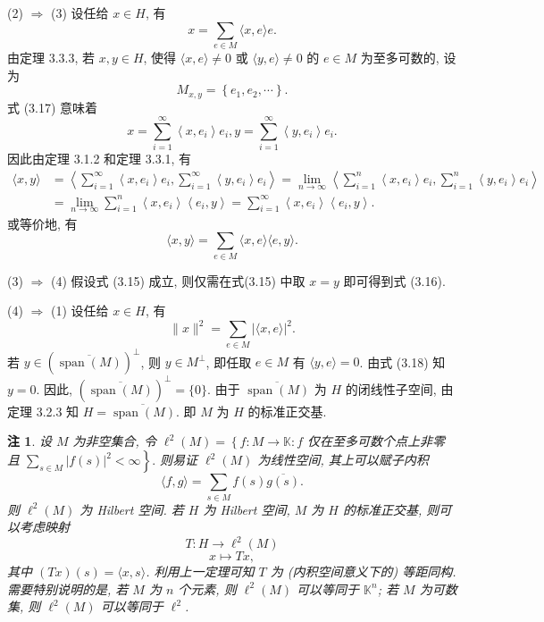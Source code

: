 \documentclass[openany]{ctexbook}
\makeatletter
\theoremstyle{kaiti}
\theoremstyle{normal}
\newtheorem{remark}{注}[section]
\renewenvironment{proof}[1][\proofname]{\par
    \pushQED{\qed}%
    \normalfont \topsep6\p@\@plus6\p@\relax
    \trivlist
    \item\relax
    {\heiti #1}\hspace{2\labelsep}\ignorespaces
  }{%
    \popQED\endtrivlist\@endpefalse
  }
\makeatother
\begin{document}
\begin{proof}
(2) $\Rightarrow$ (3) 设任给 $x \in H$, 有
\begin{equation}
  x=\sum_{e \in M}\langle x, e\rangle e.
\end{equation}
由定理 3.3.3, 若 $x, y \in H$, 使得 $\langle x, e\rangle \neq 0$ 或 $\langle y, e\rangle \neq 0$ 的 $e \in M$ 为至多可数的, 设为
$$
M_{x, y}=\left\{e_1, e_2, \cdots\right\}.
$$
式 (3.17) 意味着
$$
x=\sum_{i=1}^{\infty}\left\langle x, e_{i}\right\rangle e_{i}, y=\sum_{i=1}^{\infty}\left\langle y, e_{i}\right\rangle e_{i}.
$$
因此由定理 3.1.2 和定理 3.3.1, 有
$$
\begin{aligned}
\langle x, y\rangle &=\left\langle\sum_{i=1}^{\infty}\left\langle x, e_{i}\right\rangle e_{i}, \sum_{i=1}^{\infty}\left\langle y, e_{i}\right\rangle e_{i}\right\rangle=\lim_{n \rightarrow \infty}\left\langle\sum_{i=1}^n\left\langle x, e_{i}\right\rangle e_{i}, \sum_{i=1}^n\left\langle y, e_{i}\right\rangle e_{i}\right\rangle \\
&=\lim_{n \rightarrow \infty} \sum_{i=1}^n\left\langle x, e_{i}\right\rangle\left\langle e_{i}, y\right\rangle=\sum_{i=1}^{\infty}\left\langle x, e_{i}\right\rangle\left\langle e_{i}, y\right\rangle.
\end{aligned}
$$
或等价地, 有
$$
\langle x, y\rangle=\sum_{e \in M}\langle x, e\rangle\langle e, y\rangle.
$$

(3) $\Rightarrow$ (4) 假设式 (3.15) 成立, 则仅需在式(3.15) 中取 $x=y$ 即可得到式 (3.16).

(4) $\Rightarrow$ (1) 设任给 $x \in H$, 有
\begin{equation}
  \|x\|^2=\sum_{e \in M}|\langle x, e\rangle|^2.
\end{equation}
若 $y \in(\overline{\operatorname{span}(M)})^{\perp}$, 则 $y \in M^{\perp}$, 即任取 $e \in M$ 有 $\langle y, e\rangle=0$. 由式 (3.18) 知 $y=0$. 因此, $(\overline{\operatorname{span}(M)})^{\perp}=\{0\}$. 由于 $\overline{\operatorname{span}(M)}$ 为 $H$ 的闭线性子空间, 由定理 3.2.3 知 $H=\overline{\operatorname{span}(M)}$. 即 $M$ 为 $H$ 的标准正交基.
\end{proof}

\begin{remark}
设 $M$ 为非空集合, 令 $\ell^2(M)=\left\{f: M \rightarrow \mathbb{K}: f\right.$ 仅在至多可数个点上非零且 $\left.\sum_{s \in M}|f(s)|^2<\infty\right\}.$ 则易证 $\ell^2(M)$ 为线性空间, 其上可以赋子内积
$$
\langle f, g\rangle=\sum_{s \in M} f(s) \overline{g(s)}.
$$
则 $\ell^2(M)$ 为 Hilbert 空间. 若 $H$ 为 Hilbert 空间, $M$ 为 $H$ 的标准正交基, 则可以考虑映射
$$
T: H \rightarrow \ell^2(M)
$$
$$
x \mapsto T x,
$$
其中 $(T x)(s)=\langle x, s\rangle$. 利用上一定理可知 $T$ 为 (内积空间意义下的) 等距同构. 需要特别说明的是, 若 $M$ 为 $n$ 个元素, 则 $\ell^2(M)$ 可以等同于 $\mathbb{K}^n$; 若 $M$ 为可数集, 则 $\ell^2(M)$ 可以等同于 $\ell^2$.
\end{remark}
\end{document}
